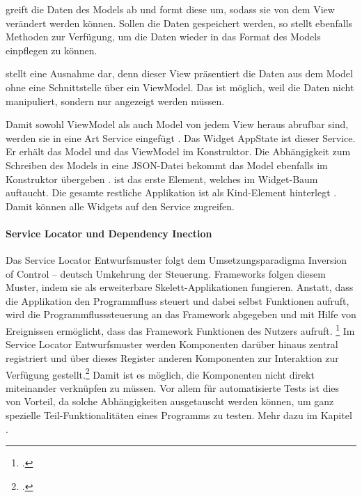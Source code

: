  greift die Daten des Models ab und formt diese um, sodass sie von dem View   verändert werden können.
Sollen die Daten gespeichert werden, so stellt  ebenfalls Methoden zur Verfügung, um die Daten wieder in das Format des Models einpflegen zu können.

  stellt eine Ausnahme dar, denn dieser View präsentiert die Daten aus dem Model ohne eine Schnittstelle über ein ViewModel.
Das ist möglich, weil die Daten nicht manipuliert, sondern nur angezeigt werden müssen.

Damit sowohl ViewModel als auch Model von jedem View heraus abrufbar sind, werden sie in eine Art Service eingefügt .
Das Widget AppState ist dieser Service.
 Er erhält das Model  und das ViewModel   im Konstruktor.
Die Abhängigkeit zum Schreiben des Models in eine JSON-Datei  bekommt das Model ebenfalls im Konstruktor übergeben .
 ist das erste Element, welches im Widget-Baum auftaucht.
Die gesamte restliche Applikation ist als Kind-Element hinterlegt .
Damit können alle Widgets auf den Service zugreifen.


\paragraph{Service Locator und Dependency Inection}

Das Service Locator Entwurfsmuster folgt dem Umsetzungsparadigma Inversion of Control – deutsch Umkehrung der Steuerung.
Frameworks folgen diesem Muster, indem sie als erweiterbare Skelett-Applikationen fungieren.
Anstatt, dass die Applikation den Programmfluss steuert und dabei selbst Funktionen aufruft, wird die Programmflusssteuerung an das Framework abgegeben und mit Hilfe von Ereignissen ermöglicht, dass das Framework Funktionen des Nutzers aufruft.
\footcite[Vgl.][]{johnson1988designing}
Im Service Locator Entwurfsmuster werden Komponenten darüber hinaus zentral registriert und über dieses Register anderen Komponenten zur Interaktion zur Verfügung gestellt.\footcite[Vgl.][]{fowler2004DependencyInjection}
Damit ist es möglich, die Komponenten nicht direkt miteinander verknüpfen zu müssen.
Vor allem für automatisierte Tests ist dies von Vorteil, da solche Abhängigkeiten ausgetauscht werden können, um ganz spezielle Teil-Funktionalitäten eines Programms zu testen.
 Mehr dazu im Kapitel .


